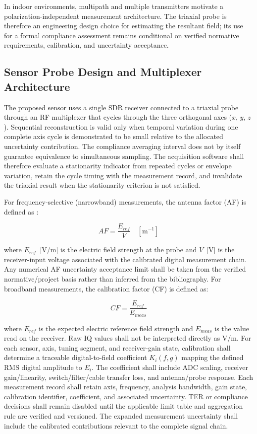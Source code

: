 \documentclass[11pt,a4paper]{article}
\begin{document}
In indoor environments, multipath and multiple transmitters motivate a polarization-independent measurement architecture. The triaxial probe is therefore an engineering design choice for estimating the resultant field; its use for a formal compliance assessment remains conditional on verified normative requirements, calibration, and uncertainty acceptance.

\subsection{Sensor Probe Design and Multiplexer Architecture}

The proposed sensor uses a single SDR receiver connected to a triaxial probe through an RF multiplexer that cycles through the three orthogonal axes ($x$, $y$, $z$). Sequential reconstruction is valid only when temporal variation during one complete axis cycle is demonstrated to be small relative to the allocated uncertainty contribution. The compliance averaging interval does not by itself guarantee equivalence to simultaneous sampling. The acquisition software shall therefore evaluate a stationarity indicator from repeated cycles or envelope variation, retain the cycle timing with the measurement record, and invalidate the triaxial result when the stationarity criterion is not satisfied.

For frequency-selective (narrowband) measurements, the antenna factor (AF) is defined as \cite{itut_k61}:

\begin{equation}
    AF = \frac{E_{ref}}{V} \quad [\text{m}^{-1}]
    \label{eq:antenna_factor}
\end{equation}

\noindent where $E_{ref}$~[V/m] is the electric field strength at the probe and $V$~[V] is the receiver-input voltage associated with the calibrated digital measurement chain. Any numerical AF uncertainty acceptance limit shall be taken from the verified normative/project basis rather than inferred from the bibliography. For broadband measurements, the calibration factor (CF) is defined as:

\begin{equation}
    CF = \frac{E_{ref}}{E_{meas}}
    \label{eq:calibration_factor}
\end{equation}

\noindent where $E_{ref}$ is the expected electric reference field strength and $E_{meas}$ is the value read on the receiver. Raw IQ values shall not be interpreted directly as V/m. For each sensor, axis, tuning segment, and receiver-gain state, calibration shall determine a traceable digital-to-field coefficient $K_i(f,g)$ mapping the defined RMS digital amplitude to $E_i$. The coefficient shall include ADC scaling, receiver gain/linearity, switch/filter/cable transfer loss, and antenna/probe response. Each measurement record shall retain axis, frequency, analysis bandwidth, gain state, calibration identifier, coefficient, and associated uncertainty. TER or compliance decisions shall remain disabled until the applicable limit table and aggregation rule are verified and versioned. The expanded measurement uncertainty shall include the calibrated contributions relevant to the complete signal chain.
\end{document}
